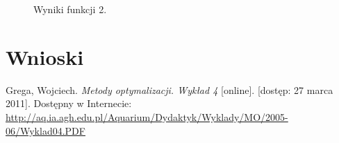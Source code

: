 \documentclass{classrep}
\begin{document}
\begin{figure}
\noindent{}
\caption{Wyniki funkcji 2.}
\end{figure}

\section{Wnioski}

\begin{thebibliography}{99}
Grega, Wojciech. \textit{Metody optymalizacji. Wykład 4} [online]. [dostęp: 27
marca 2011]. Dostępny w Internecie:
\url{http://aq.ia.agh.edu.pl/Aquarium/Dydaktyk/Wyklady/MO/2005-06/Wyklad04.PDF}
\end{thebibliography}
\end{document}
